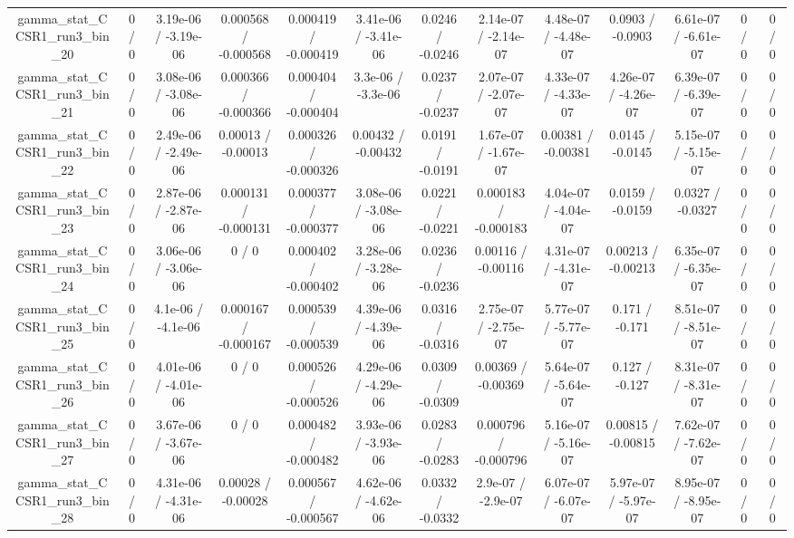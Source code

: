 \documentclass[10pt]{article}
\begin{document}
\begin{table}[htbp]
\begin{center}
\begin{tabular}{|c|c|c|c|c|c|c|c|c|c|c|c|c|}
  gamma_stat_CCSR1_run3_bin_20 & 0 / 0 & 3.19e-06 / -3.19e-06 & 0.000568 / -0.000568 & 0.000419 / -0.000419 & 3.41e-06 / -3.41e-06 & 0.0246 / -0.0246 & 2.14e-07 / -2.14e-07 & 4.48e-07 / -4.48e-07 & 0.0903 / -0.0903 & 6.61e-07 / -6.61e-07 & 0 / 0 & 0 / 0 \\ 
  gamma_stat_CCSR1_run3_bin_21 & 0 / 0 & 3.08e-06 / -3.08e-06 & 0.000366 / -0.000366 & 0.000404 / -0.000404 & 3.3e-06 / -3.3e-06 & 0.0237 / -0.0237 & 2.07e-07 / -2.07e-07 & 4.33e-07 / -4.33e-07 & 4.26e-07 / -4.26e-07 & 6.39e-07 / -6.39e-07 & 0 / 0 & 0 / 0 \\ 
  gamma_stat_CCSR1_run3_bin_22 & 0 / 0 & 2.49e-06 / -2.49e-06 & 0.00013 / -0.00013 & 0.000326 / -0.000326 & 0.00432 / -0.00432 & 0.0191 / -0.0191 & 1.67e-07 / -1.67e-07 & 0.00381 / -0.00381 & 0.0145 / -0.0145 & 5.15e-07 / -5.15e-07 & 0 / 0 & 0 / 0 \\ 
  gamma_stat_CCSR1_run3_bin_23 & 0 / 0 & 2.87e-06 / -2.87e-06 & 0.000131 / -0.000131 & 0.000377 / -0.000377 & 3.08e-06 / -3.08e-06 & 0.0221 / -0.0221 & 0.000183 / -0.000183 & 4.04e-07 / -4.04e-07 & 0.0159 / -0.0159 & 0.0327 / -0.0327 & 0 / 0 & 0 / 0 \\ 
  gamma_stat_CCSR1_run3_bin_24 & 0 / 0 & 3.06e-06 / -3.06e-06 & 0 / 0 & 0.000402 / -0.000402 & 3.28e-06 / -3.28e-06 & 0.0236 / -0.0236 & 0.00116 / -0.00116 & 4.31e-07 / -4.31e-07 & 0.00213 / -0.00213 & 6.35e-07 / -6.35e-07 & 0 / 0 & 0 / 0 \\ 
  gamma_stat_CCSR1_run3_bin_25 & 0 / 0 & 4.1e-06 / -4.1e-06 & 0.000167 / -0.000167 & 0.000539 / -0.000539 & 4.39e-06 / -4.39e-06 & 0.0316 / -0.0316 & 2.75e-07 / -2.75e-07 & 5.77e-07 / -5.77e-07 & 0.171 / -0.171 & 8.51e-07 / -8.51e-07 & 0 / 0 & 0 / 0 \\ 
  gamma_stat_CCSR1_run3_bin_26 & 0 / 0 & 4.01e-06 / -4.01e-06 & 0 / 0 & 0.000526 / -0.000526 & 4.29e-06 / -4.29e-06 & 0.0309 / -0.0309 & 0.00369 / -0.00369 & 5.64e-07 / -5.64e-07 & 0.127 / -0.127 & 8.31e-07 / -8.31e-07 & 0 / 0 & 0 / 0 \\ 
  gamma_stat_CCSR1_run3_bin_27 & 0 / 0 & 3.67e-06 / -3.67e-06 & 0 / 0 & 0.000482 / -0.000482 & 3.93e-06 / -3.93e-06 & 0.0283 / -0.0283 & 0.000796 / -0.000796 & 5.16e-07 / -5.16e-07 & 0.00815 / -0.00815 & 7.62e-07 / -7.62e-07 & 0 / 0 & 0 / 0 \\ 
  gamma_stat_CCSR1_run3_bin_28 & 0 / 0 & 4.31e-06 / -4.31e-06 & 0.00028 / -0.00028 & 0.000567 / -0.000567 & 4.62e-06 / -4.62e-06 & 0.0332 / -0.0332 & 2.9e-07 / -2.9e-07 & 6.07e-07 / -6.07e-07 & 5.97e-07 / -5.97e-07 & 8.95e-07 / -8.95e-07 & 0 / 0 & 0 / 0 \\ 

\end{tabular}
\end{center}
\end{table}
\end{document}
